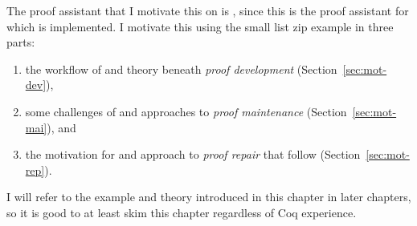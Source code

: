 The proof assistant that I motivate this on is , since this is the proof assistant for which \sysnamelong is implemented.
I motivate this using the small list zip example in three parts:

\begin{enumerate}
\item the workflow of and theory beneath \textit{proof development} (Section~\ref{sec:mot-dev}),
\item some challenges of and approaches to \textit{proof maintenance} (Section~\ref{sec:mot-mai}), and
\item the motivation for and approach to \textit{proof repair} that follow (Section~\ref{sec:mot-rep}).
\end{enumerate}
I will refer to the example and theory introduced in this chapter in later chapters, so it is good to at least skim this chapter regardless of Coq experience.









